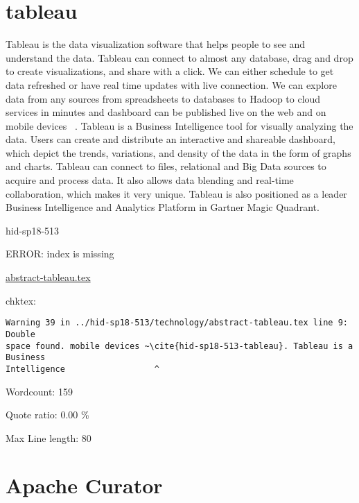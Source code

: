 \section{tableau}

Tableau is the data visualization software that helps people to see and 
understand the data. Tableau can connect to almost any database, drag and drop
to create visualizations, and share with a click. We can either schedule to get
data refreshed or have real time updates with live connection.  We can explore
data from any sources from spreadsheets to databases to Hadoop to cloud 
services in minutes and  dashboard can be published live on the web and on
mobile devices ~\cite{hid-sp18-513-tableau}. Tableau is a Business Intelligence 
tool for visually analyzing the data. Users can create and distribute an 
interactive and shareable dashboard, which depict the trends, variations, and
density of the data in the form of graphs and charts. Tableau can connect to 
files, relational and Big Data sources to acquire and process data. It also
allows data blending and real-time collaboration, which makes it very unique. 
Tableau is also positioned as a leader Business Intelligence and Analytics 
Platform in Gartner Magic Quadrant.


\begin{IU}

hid-sp18-513

ERROR: index is missing

\href{https://github.com/cloudmesh-community/hid-sp18-513/blob/master//technology/abstract-tableau.tex}{abstract-tableau.tex}

 
chktex:
\begin{tiny}
\begin{verbatim}
Warning 39 in ../hid-sp18-513/technology/abstract-tableau.tex line 9: Double
space found. mobile devices ~\cite{hid-sp18-513-tableau}. Tableau is a Business
Intelligence                  ^
\end{verbatim}
\end{tiny}

Wordcount: 159


Quote ratio: 0.00 \%
 
Max Line length: 80
\end{IU}

\section{Apache Curator}

